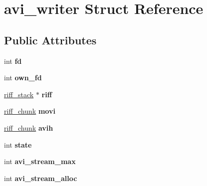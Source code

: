 \hypertarget{structavi__writer}{\section{avi\-\_\-writer Struct Reference}
\label{structavi__writer}
}
\subsection*{Public Attributes}
\begin{DoxyCompactItemize}
\item 
\hypertarget{structavi__writer_aac95a9730f68b423547b938ebcb8cad6}{int {\bfseries fd}}\label{structavi__writer_aac95a9730f68b423547b938ebcb8cad6}

\item 
\hypertarget{structavi__writer_ad9e6b7e8487dc55b3099360f9aac08ab}{int {\bfseries own\-\_\-fd}}\label{structavi__writer_ad9e6b7e8487dc55b3099360f9aac08ab}

\item 
\hypertarget{structavi__writer_a5cb2edfa610bfa579783b4135469a7b8}{\hyperlink{structriff__stack}{riff\-\_\-stack} $\ast$ {\bfseries riff}}\label{structavi__writer_a5cb2edfa610bfa579783b4135469a7b8}

\item 
\hypertarget{structavi__writer_ae4c26345232fe2ffcebf5ad659f23d6d}{\hyperlink{structriff__chunk}{riff\-\_\-chunk} {\bfseries movi}}\label{structavi__writer_ae4c26345232fe2ffcebf5ad659f23d6d}

\item 
\hypertarget{structavi__writer_a6346fa58152b7e21d7a5c29d9c2931c0}{\hyperlink{structriff__chunk}{riff\-\_\-chunk} {\bfseries avih}}\label{structavi__writer_a6346fa58152b7e21d7a5c29d9c2931c0}

\item 
\hypertarget{structavi__writer_a9ad50465180ee0cb7a1f365852f82db3}{int {\bfseries state}}\label{structavi__writer_a9ad50465180ee0cb7a1f365852f82db3}

\item 
\hypertarget{structavi__writer_aa75f9c8fe6c68b60880a55662c2ee52c}{int {\bfseries avi\-\_\-stream\-\_\-max}}\label{structavi__writer_aa75f9c8fe6c68b60880a55662c2ee52c}

\item 
\hypertarget{structavi__writer_ab6f4d53c8b39385097169a910e9fe8b7}{int {\bfseries avi\-\_\-stream\-\_\-alloc}}\label{structavi__writer_ab6f4d53c8b39385097169a910e9fe8b7}


\end{DoxyCompactItemize}
